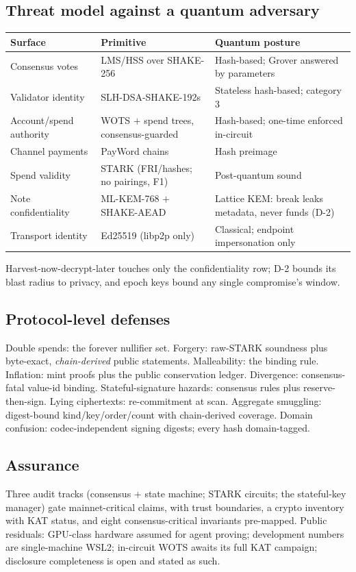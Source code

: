 \documentclass[11pt]{article}
\begin{document}
\subsection{Threat model against a quantum adversary}
\begin{center}
\begin{tabular}{@{}p{3.6cm}p{4.6cm}p{5.6cm}@{}}
\toprule
Surface & Primitive & Quantum posture \\
\midrule
Consensus votes & LMS/HSS over SHAKE-256 & Hash-based; Grover answered by parameters \\
Validator identity & SLH-DSA-SHAKE-192s & Stateless hash-based; category 3 \\
Account/spend authority & WOTS $+$ spend trees, consensus-guarded & Hash-based; one-time enforced in-circuit \\
Channel payments & PayWord chains & Hash preimage \\
Spend validity & STARK (FRI/hashes; no pairings, F1) & Post-quantum sound \\
Note confidentiality & ML-KEM-768 $+$ SHAKE-AEAD & Lattice KEM: break leaks metadata, never funds (D-2) \\
Transport identity & Ed25519 (libp2p only) & Classical; endpoint impersonation only \\
\bottomrule
\end{tabular}
\end{center}
Harvest-now-decrypt-later touches only the confidentiality row; D-2 bounds its blast radius to privacy, and epoch keys bound any single compromise's window.

\subsection{Protocol-level defenses}
Double spends: the forever nullifier set. Forgery: raw-STARK soundness plus byte-exact, \emph{chain-derived} public statements. Malleability: the binding rule. Inflation: mint proofs plus the public conservation ledger. Divergence: consensus-fatal value-id binding. Stateful-signature hazards: consensus rules plus reserve-then-sign. Lying ciphertexts: re-commitment at scan. Aggregate smuggling: digest-bound kind/key/order/count with chain-derived coverage. Domain confusion: codec-independent signing digests; every hash domain-tagged.

\subsection{Assurance}
Three audit tracks (consensus $+$ state machine; STARK circuits; the stateful-key manager) gate mainnet-critical claims, with trust boundaries, a crypto inventory with KAT status, and eight consensus-critical invariants pre-mapped. Public residuals: GPU-class hardware assumed for agent proving; development numbers are single-machine WSL2; in-circuit WOTS awaits its full KAT campaign; disclosure completeness is open and stated as such.
\end{document}
